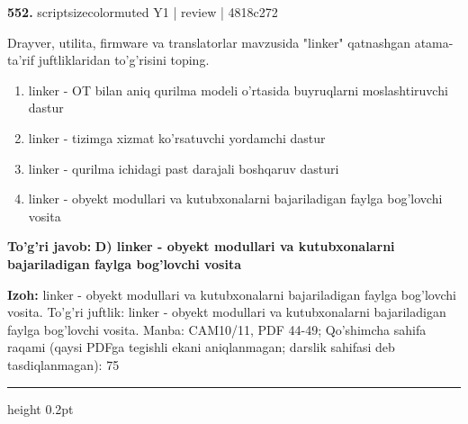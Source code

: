 \documentclass[10pt,a4paper]{article}
\begin{document}
{\bfseries\sffamily\color{ink} 552.} {scriptsizecolor{muted} Y1 | review | 4818c272}
\par
Drayver, utilita, firmware va translatorlar mavzusida "linker" qatnashgan atama-ta'rif juftliklaridan to'g'risini toping.
\begin{enumerate}[label=\Alph*),leftmargin=9mm]
\item linker - OT bilan aniq qurilma modeli o'rtasida buyruqlarni moslashtiruvchi dastur
\item linker - tizimga xizmat ko'rsatuvchi yordamchi dastur
\item linker - qurilma ichidagi past darajali boshqaruv dasturi
\item linker - obyekt modullari va kutubxonalarni bajariladigan faylga bog'lovchi vosita
\end{enumerate}
\begin{tcolorbox}[enhanced,breakable,colback=teal!4,colframe=teal!60!black,boxrule=0.45pt,arc=1.2mm,left=2.7mm,right=2.7mm,top=1.8mm,bottom=1.8mm,before skip=2mm,after skip=2mm]
{\bfseries\sffamily\color{teal}To'g'ri javob:} \textbf{D) linker - obyekt modullari va kutubxonalarni bajariladigan faylga bog'lovchi vosita}
\par\smallskip
{\bfseries Izoh:} linker - obyekt modullari va kutubxonalarni bajariladigan faylga bog'lovchi vosita. To'g'ri juftlik: linker - obyekt modullari va kutubxonalarni bajariladigan faylga bog'lovchi vosita. Manba: CAM10/11, PDF 44-49; Qo'shimcha sahifa raqami (qaysi PDFga tegishli ekani aniqlanmagan; darslik sahifasi deb tasdiqlanmagan): 75
\end{tcolorbox}
\vspace{2mm}\hrule height 0.2pt\vspace{3mm}
\end{document}
